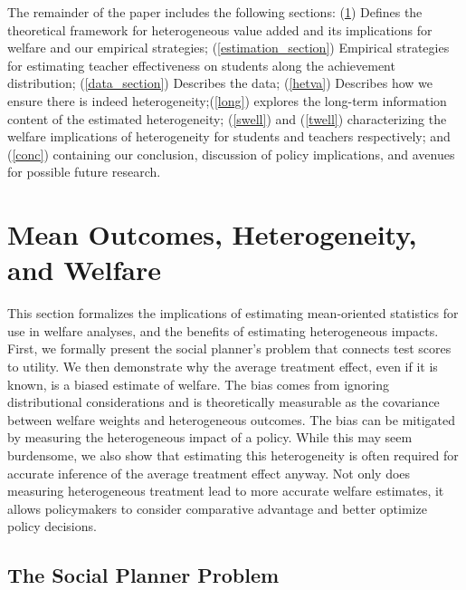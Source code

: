 \documentclass[12pt]{article}
\theoremstyle{definition}
\theoremstyle{definition}
\theoremstyle{definition}
\theoremstyle{definition}
\begin{document}
    The remainder of the paper includes the following sections: (\ref{theory_setion}) Defines the theoretical framework for heterogeneous value added and its implications for welfare and our empirical strategies; (\ref{estimation_section}) Empirical strategies for estimating teacher effectiveness on students along the achievement distribution; (\ref{data_section}) Describes the data; (\ref{hetva}) Describes how we ensure there is indeed heterogeneity;(\ref{long}) explores the long-term information content of the estimated heterogeneity; (\ref{swell}) and (\ref{twell}) characterizing the welfare implications of heterogeneity for students and teachers respectively; and (\ref{conc}) containing our conclusion, discussion of policy implications, and avenues for possible future research.

    
    


\section{Mean Outcomes, Heterogeneity, and Welfare}
\label{theory_setion}


    This section formalizes the implications of estimating mean-oriented statistics for use in welfare analyses, and the benefits of estimating heterogeneous impacts. First, we formally present the social planner's problem that connects test scores to utility. We then demonstrate why the average treatment effect, even if it is known, is a biased estimate of welfare. The bias comes from ignoring distributional considerations and is  theoretically measurable as the covariance between welfare weights and heterogeneous outcomes. The bias can be mitigated by measuring the heterogeneous impact of a policy. While this may seem burdensome, we also show that estimating this heterogeneity is often required for accurate inference of the average treatment effect anyway.
    Not only does measuring heterogeneous treatment lead to more accurate welfare estimates, it allows policymakers to consider comparative advantage and better optimize policy decisions. 
    
\subsection{The Social Planner Problem}
\end{document}
